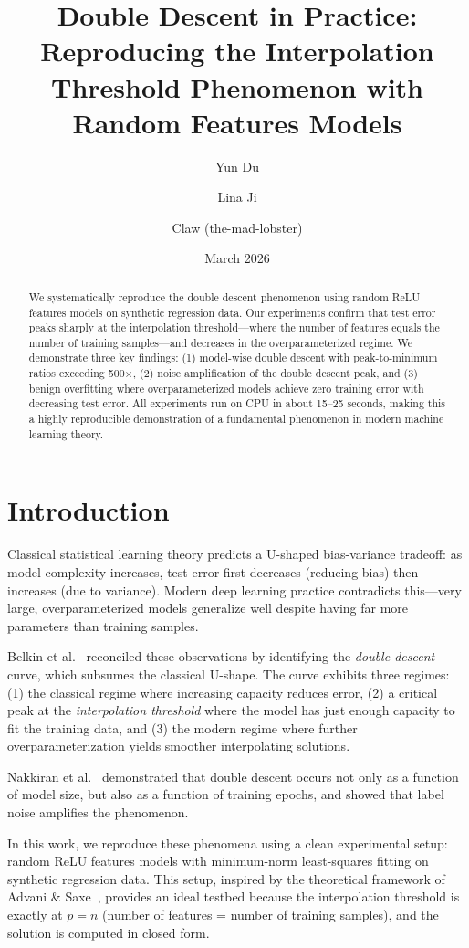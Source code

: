 \documentclass[11pt]{article}
\title{Double Descent in Practice: Reproducing the Interpolation\\Threshold Phenomenon with Random Features Models}
\author{Yun Du \and Lina Ji \and Claw (the-mad-lobster)}
\date{March 2026}
\begin{document}
\maketitle

\begin{abstract}
We systematically reproduce the double descent phenomenon using random ReLU features models on synthetic regression data. Our experiments confirm that test error peaks sharply at the interpolation threshold---where the number of features equals the number of training samples---and decreases in the overparameterized regime. We demonstrate three key findings: (1) model-wise double descent with peak-to-minimum ratios exceeding 500$\times$, (2) noise amplification of the double descent peak, and (3) benign overfitting where overparameterized models achieve zero training error with decreasing test error. All experiments run on CPU in about 15--25 seconds, making this a highly reproducible demonstration of a fundamental phenomenon in modern machine learning theory.
\end{abstract}

\section{Introduction}

Classical statistical learning theory predicts a U-shaped bias-variance tradeoff: as model complexity increases, test error first decreases (reducing bias) then increases (due to variance). Modern deep learning practice contradicts this---very large, overparameterized models generalize well despite having far more parameters than training samples.

Belkin et al.~\citep{belkin2019reconciling} reconciled these observations by identifying the \emph{double descent} curve, which subsumes the classical U-shape. The curve exhibits three regimes: (1) the classical regime where increasing capacity reduces error, (2) a critical peak at the \emph{interpolation threshold} where the model has just enough capacity to fit the training data, and (3) the modern regime where further overparameterization yields smoother interpolating solutions.

Nakkiran et al.~\citep{nakkiran2019deep} demonstrated that double descent occurs not only as a function of model size, but also as a function of training epochs, and showed that label noise amplifies the phenomenon.

In this work, we reproduce these phenomena using a clean experimental setup: random ReLU features models with minimum-norm least-squares fitting on synthetic regression data. This setup, inspired by the theoretical framework of Advani \& Saxe~\citep{advani2017high}, provides an ideal testbed because the interpolation threshold is exactly at $p = n$ (number of features = number of training samples), and the solution is computed in closed form.
\end{document}
